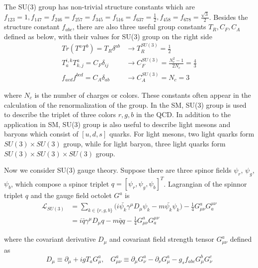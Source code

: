 \noindent The SU(3) group has non-trivial structure constants which are $f_{123}=1, f_{147}= f_{246}=f_{257}= f_{345}= f_{516}= f_{637}=\frac{1}{2}, f_{458} = f_{678}=\frac{\sqrt{3}}{2}$. Besides the structure constant $f_{abc}$, there are also three useful group constants $T_R, C_F, C_A$ defined as below, with their values for SU(3) group on the right side
%
\begin{align}
	Tr(T^aT^b)=T_R \delta^{ab}  &\longrightarrow  T_R^{SU(3)}  = \frac{1}{2} \\
    T_a^{i,k}T^a_{k,j} = C_F \delta_{ij}  &\longrightarrow  C_F^{SU(3)} = \frac{N_c^2-1}{2N_c} = \frac{4}{3} \\
    f_{acd}f^{bcd} = C_A \delta_{ab} &\longrightarrow C_A^{SU(3)}  =N_c = 3
\end{align}

\noindent where $N_c$ is the number of charges or colors. These constants often appear in the calculation of the renormalization of the group. In the SM, SU(3) group is used to describe the triplet of three colors $r,g,b$ in the QCD. In addition to the application in SM, SU(3) group is also useful to describe light mesons and baryons which consist of $[u,d,s]$ quarks. For light mesons, two light quarks form $SU(3) \times SU(3)$ group, while for light baryon, three light quarks form $SU(3) \times SU(3) \times SU(3)$ group.


\noindent Now we consider SU(3) gauge theory. Suppose there are three spinor fields $\psi_r$, $\psi_g$, $\psi_b$, which compose a spinor triplet $q = [ \psi_r, \psi_g, \psi_b ]^T$. Lagrangian of the spinnor triplet $q$ and the gauge field octolet $G^a$ is
\begin{equation}
\begin{split}
    \mathcal{L}_{SU(3)}  &= \sum_{k \in \{r,g,b\}} \big( i\bar{\psi_k}\gamma^\mu D_\mu \psi_k  - m\bar{\psi_k} \psi_k \big) - \frac{1}{4}G^a_{\mu\nu}G^{\mu\nu}_a \\
    &= i\bar{q}\gamma^\mu D_\mu q  - m\bar{q} q - \frac{1}{4}G^a_{\mu\nu}G^{\mu\nu}_a
\end{split}
\label{eqn:physics:qft:su3Lagrangian}
\end{equation}

\noindent where the covariant derivative $D_\mu$ and covariant field strength tensor $G^a_{\mu\nu}$ defined as
\begin{equation}
    D_\mu \equiv \partial_\mu +i g T_a G^a_\mu , \;\;\; 
    G^a_{\mu\nu} \equiv \partial_\mu G^a_\nu - \partial_\nu G^a_\mu - g_s f_{abc} G^b_\mu G^c_\nu
    \label{eqn:physics:qft:su3Covariant}
\end{equation}

